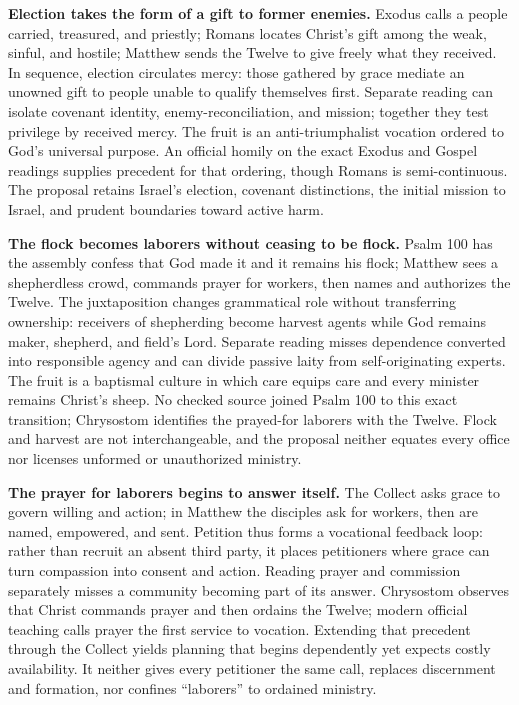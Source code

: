 \noindent\textbf{Election takes the form of a gift to former enemies.\enspace{}}
Exodus calls a people carried, treasured, and priestly; Romans locates Christ's gift among the weak, sinful, and hostile; Matthew sends the Twelve to give freely what they received. In sequence, election circulates mercy: those gathered by grace mediate an unowned gift to people unable to qualify themselves first. Separate reading can isolate covenant identity, enemy-reconciliation, and mission; together they test privilege by received mercy. The fruit is an anti-triumphalist vocation ordered to God's universal purpose. An official homily on the exact Exodus and Gospel readings supplies precedent for that ordering, though Romans is semi-continuous. The proposal retains Israel's election, covenant distinctions, the initial mission to Israel, and prudent boundaries toward active harm.

\noindent\textbf{The flock becomes laborers without ceasing to be flock.\enspace{}}
Psalm 100 has the assembly confess that God made it and it remains his flock; Matthew sees a shepherdless crowd, commands prayer for workers, then names and authorizes the Twelve. The juxtaposition changes grammatical role without transferring ownership: receivers of shepherding become harvest agents while God remains maker, shepherd, and field's Lord. Separate reading misses dependence converted into responsible agency and can divide passive laity from self-originating experts. The fruit is a baptismal culture in which care equips care and every minister remains Christ's sheep. No checked source joined Psalm 100 to this exact transition; Chrysostom identifies the prayed-for laborers with the Twelve. Flock and harvest are not interchangeable, and the proposal neither equates every office nor licenses unformed or unauthorized ministry.

\noindent\textbf{The prayer for laborers begins to answer itself.\enspace{}}
The Collect asks grace to govern willing and action; in Matthew the disciples ask for workers, then are named, empowered, and sent. Petition thus forms a vocational feedback loop: rather than recruit an absent third party, it places petitioners where grace can turn compassion into consent and action. Reading prayer and commission separately misses a community becoming part of its answer. Chrysostom observes that Christ commands prayer and then ordains the Twelve; modern official teaching calls prayer the first service to vocation. Extending that precedent through the Collect yields planning that begins dependently yet expects costly availability. It neither gives every petitioner the same call, replaces discernment and formation, nor confines “laborers” to ordained ministry.

